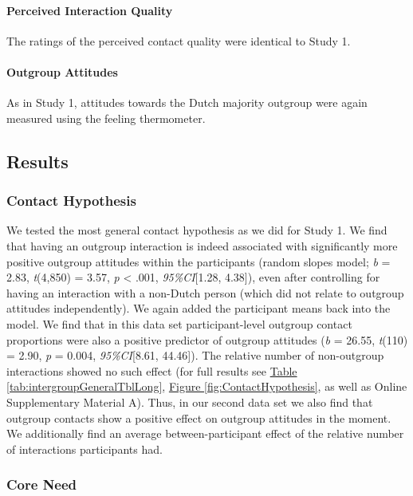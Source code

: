 \documentclass[man, 12pt, a4paper, mask]{apa7}
\theoremstyle{break}
\theoremstyle{plain}
\newcommand{\fgrref}[2][]{\hyperref[#2]{Figure \ref*{#2}#1}}
\newcommand{\tblref}[2][]{\hyperref[#2]{Table \ref*{#2}#1}}
\providecommand{\DIFaddtex}[1]{{\protect\color{blue}\uwave{#1}}} %
\providecommand{\DIFaddbegin}{} %
\providecommand{\DIFaddend}{} %
\providecommand{\DIFadd}[1]{\texorpdfstring{\DIFaddtex{#1}}{#1}} %
\newcommand{\DIFaddincludegraphics}[2][]{{\color{blue}\fbox{\DIFOincludegraphics[#1]{#2}}}} %
\DeclareRobustCommand{\DIFaddbegin}{\DIFOaddbegin \let\includegraphics\DIFaddincludegraphics} %
\DeclareRobustCommand{\DIFaddend}{\DIFOaddend \let\includegraphics\DIFOincludegraphics} %
\begin{document}
\paragraph{Perceived Interaction Quality}

The ratings of the perceived contact quality were identical to Study 1.

\paragraph{Outgroup Attitudes}

As in Study 1, attitudes towards the Dutch majority outgroup were again
measured using the feeling thermometer.

\subsection{Results}

\subsubsection{Contact Hypothesis}

We tested the most general contact hypothesis as we did for Study 1. We
find that having an outgroup interaction is indeed associated with
significantly more positive outgroup attitudes within the participants
(random slopes model; \textit{b} = 2.83, \textit{t}(4,850) = 3.57,
\textit{p} \textless{} .001, \textit{95\%CI}{[}1.28, 4.38{]}), even
after controlling for having an interaction with a non-Dutch person
(which did not relate to outgroup attitudes independently). We again
added the participant means back into the model. We find that in this
data set participant-level outgroup contact proportions were also a
positive predictor of outgroup attitudes (\textit{b} = 26.55,
\textit{t}(110) = 2.90, \textit{p} = 0.004, \textit{95\%CI}{[}8.61,
44.46{]}). The relative number of non-outgroup interactions showed no
such effect (for full results see \tblref{tab:intergroupGeneralTblLong},
\fgrref{fig:ContactHypothesis}, as well as Online Supplementary Material
A). Thus, in our second data set we also find that outgroup contacts
show a positive effect on outgroup attitudes in the moment. We
additionally find an average between-participant effect of the relative
number of interactions participants had.

\subsubsection{Core Need \DIFaddbegin \DIFadd{Fulfillment}\DIFaddend }
\end{document}
